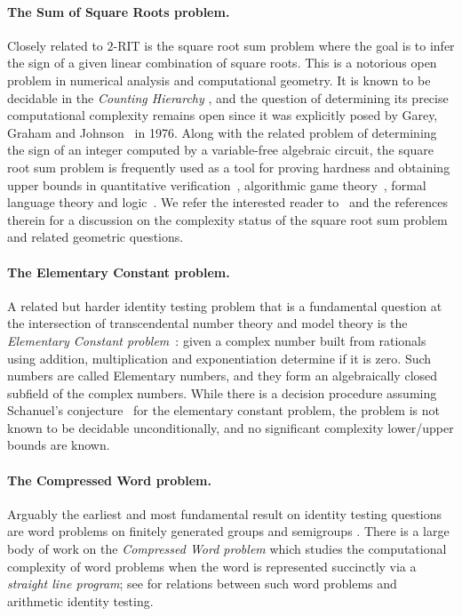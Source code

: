 \paragraph{\bf The Sum of Square Roots  problem.} Closely related to $2$-RIT is the square root sum problem where the goal is to infer the sign of a given linear combination of square roots. This is a notorious open problem in numerical analysis and computational geometry. It is known to be decidable in the \emph{Counting Hierarchy} \cite{Allender06onthe}, and the question of determining its precise computational complexity remains open since it was explicitly posed by Garey, Graham and Johnson~\cite{ggj} in 1976. Along with the related problem  of determining the sign of an integer computed by a variable-free algebraic circuit, the square root sum problem is frequently used as a tool for proving hardness and obtaining upper bounds in quantitative verification~\cite{esparza.solving, HKbudget, KWparallel, BLW}, algorithmic game theory~\cite{etessami.yannakakis, UW, CIJ}, formal language theory and logic~\cite{HKL, LOW}. We refer the interested reader to~\cite{problem33, kayal-saha} and the references therein for a discussion on the complexity status of the square root sum problem and related geometric questions.

\paragraph{\bf The Elementary Constant problem.} A related but harder identity testing problem that is a fundamental question at the intersection of transcendental number theory and model theory is the \emph{Elementary Constant problem}~\cite{richardson92}: given a complex number built from rationals using addition, multiplication and exponentiation determine if it is zero. Such numbers are called Elementary numbers, and they form an algebraically closed subfield of the complex numbers. While there is a decision procedure assuming Schanuel's conjecture~\cite{richardson97} for the elementary constant problem, the problem is not known to be decidable unconditionally, and no significant complexity lower/upper bounds are known. 


\paragraph{\bf The Compressed Word problem.} 
Arguably the earliest and most fundamental result on identity testing questions are word problems on finitely generated groups and semigroups \cite{dehn1912transformation}. There is a large body of work on the \emph{Compressed Word problem} \cite{lohrey2014compressed} which studies the computational complexity of word problems when the word is represented succinctly via a \emph{straight line program}; see \cite{konig-lohrey, balaji2021cyclotomic} for relations between such word problems and arithmetic identity testing.

